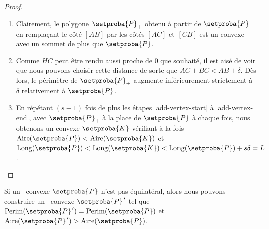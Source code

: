 \begin{proof}
\begin{enumerate}
		\item Clairement, le polygone $\setproba{P}_+$ obtenu à partir de $\setproba{P}$ en remplaçant le côté $[AB]$ par les côtés $[AC]$ et $[CB]$ est un convexe avec un sommet de plus que $\setproba{P}$.

		\item \label{add-vertex-end}
		Comme $HC$ peut être rendu aussi proche de $0$ que souhaité, il est aisé de voir que nous pouvons choisir cette distance de sorte que $AC + BC < AB + \delta$.
		Dès lors, le périmètre de $\setproba{P}_+$ augmente inférieurement strictement à $\delta$ relativement à $\setproba{P}$.

		\item En répétant $(s - 1)$ fois de plus les étapes \ref{add-vertex-start} à \ref{add-vertex-end}, avec $\setproba{P}_+$ à la place de $\setproba{P}$ à chaque fois,
		nous obtenons un  convexe $\setproba{K}$ vérifiant à la fois
		$\area{\setproba{P}} < \area{\setproba{K}}$
		et
		$\cyclelen{\setproba{P}} < \cyclelen{\setproba{K}} < \cyclelen{\setproba{P}} + s \delta = L$.
	\end{enumerate}

	\null\vspace{-6ex}
\end{proof}




\begin{fact} \label{must-be-equi}
	Si un \ngone\ convexe $\setproba{P}$ n'est pas équilatéral,
	alors nous pouvons construire un \ngone\ convexe $\primeit{\setproba{P}}$ tel que
	$\perim{\primeit{\setproba{P}}} = \perim{\setproba{P}}$
	et
	$\area{\primeit{\setproba{P}}} > \area{\setproba{P}}$.
\end{fact}


